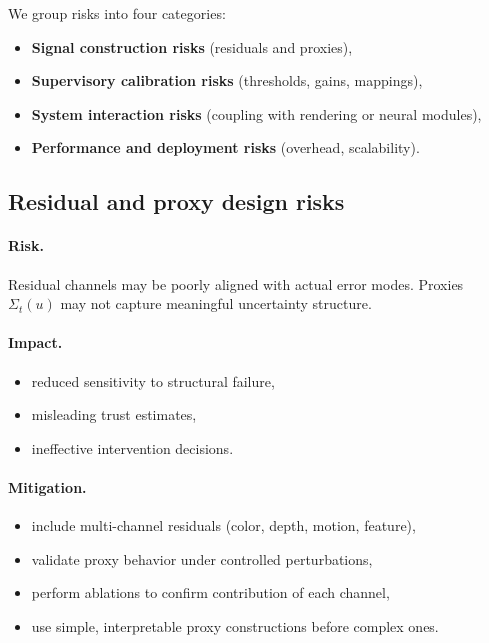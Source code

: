 \documentclass[11pt,letterpaper]{article}
\theoremstyle{gcresult}
\theoremstyle{definition}
\begin{document}
We group risks into four categories:

\begin{itemize}[leftmargin=1.5em]
    \item \textbf{Signal construction risks} (residuals and proxies),
    \item \textbf{Supervisory calibration risks} (thresholds, gains, mappings),
    \item \textbf{System interaction risks} (coupling with rendering or neural modules),
    \item \textbf{Performance and deployment risks} (overhead, scalability).
\end{itemize}


\subsection{Residual and proxy design risks}

\paragraph{Risk.}
Residual channels may be poorly aligned with actual error modes. Proxies $\Sigma_t(u)$ may not capture meaningful uncertainty structure.

\paragraph{Impact.}
\begin{itemize}[leftmargin=1.5em]
    \item reduced sensitivity to structural failure,
    \item misleading trust estimates,
    \item ineffective intervention decisions.
\end{itemize}

\paragraph{Mitigation.}
\begin{itemize}[leftmargin=1.5em]
    \item include multi-channel residuals (color, depth, motion, feature),
    \item validate proxy behavior under controlled perturbations,
    \item perform ablations to confirm contribution of each channel,
    \item use simple, interpretable proxy constructions before complex ones.
\end{itemize}
\end{document}
